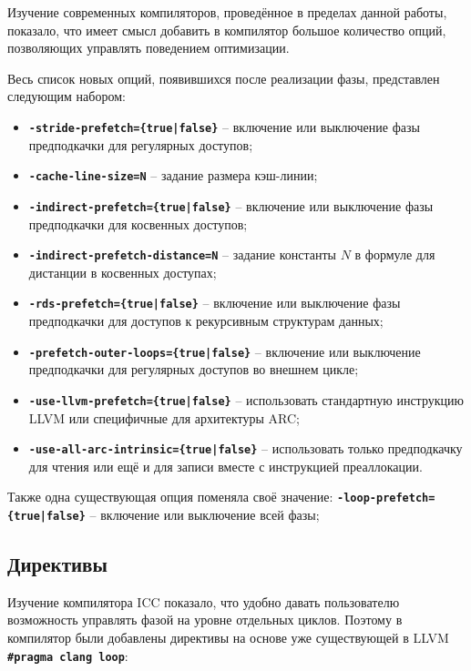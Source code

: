 \documentclass[12pt,a4paper]{article}
\begin{document}
\indent

Изучение современных компиляторов, проведённое в пределах данной работы, показало, что имеет смысл добавить в компилятор большое количество опций, позволяющих управлять поведением оптимизации.

Весь список новых опций, появившихся после реализации фазы, представлен следующим набором:

\begin{itemize}
\item \texttt{\textbf{-stride-prefetch=\{true|false\}}} -- включение или выключение фазы предподкачки для регулярных доступов;
\item \texttt{\textbf{-cache-line-size=N}} -- задание размера кэш-линии;
\item \texttt{\textbf{-indirect-prefetch=\{true|false\}}} -- включение или выключение фазы предподкачки для косвенных доступов;
\item \texttt{\textbf{-indirect-prefetch-distance=N}} -- задание константы $N$ в формуле для дистанции в косвенных доступах;
\item \texttt{\textbf{-rds-prefetch=\{true|false\}}} -- включение или выключение фазы предподкачки для доступов к рекурсивным структурам данных;
\item \texttt{\textbf{-prefetch-outer-loops=\{true|false\}}} -- включение или выключение предподкачки для регулярных доступов во внешнем цикле;
\item \texttt{\textbf{-use-llvm-prefetch=\{true|false\}}} -- использовать стандартную инструкцию LLVM или специфичные для архитектуры ARC;
\item \texttt{\textbf{-use-all-arc-intrinsic=\{true|false\}}} -- использовать только предподкачку для чтения или ещё и для записи вместе с инструкцией преаллокации.
\end{itemize}

Также одна существующая опция поменяла своё значение:\linebreak
\texttt{\textbf{-loop-prefetch=\{true|false\}}} -- включение или выключение всей фазы;

\subsection{Директивы}

\indent 
Изучение компилятора ICC показало, что удобно давать пользователю возможность управлять фазой на уровне отдельных циклов. Поэтому в компилятор были добавлены директивы на основе уже существующей в LLVM \texttt{\textbf{\#pragma clang loop}}:
\end{document}
